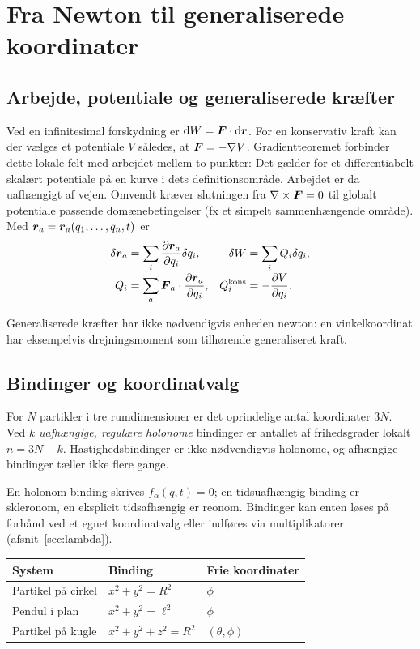 \clearpage\section{Fra Newton til generaliserede koordinater}
\subsection{Arbejde, potentiale og generaliserede kræfter}
Ved en infinitesimal forskydning er $\mathrm d W=\boldsymbol{F}\cdot \mathrm d\boldsymbol{r}$. For en konservativ kraft kan der vælges et potentiale $V$ således, at $\boldsymbol{F}=-\nabla V$.
Gradientteoremet forbinder dette lokale felt med arbejdet mellem to punkter:
Det gælder for et differentiabelt skalært potentiale på en kurve i dets definitionsområde. Arbejdet er da uafhængigt af vejen. Omvendt kræver slutningen fra $\nabla\times\boldsymbol{F}=0$ til globalt potentiale passende domænebetingelser (fx et simpelt sammenhængende område). Med $\boldsymbol{r}_a=\boldsymbol{r}_a(q_1,\ldots,q_n,t)$ er
\begin{align}
\delta\boldsymbol{r}_a&=\sum_i\frac{\partial \boldsymbol{r}_a}{\partial q_i}\delta q_i,&\delta W&=\sum_i Q_i\delta q_i,\\[-2pt]
Q_i&=\sum_a\boldsymbol{F}_a\cdot\frac{\partial \boldsymbol{r}_a}{\partial q_i},&Q_i^{\rm kons}&=-\frac{\partial V}{\partial q_i}.
\end{align}
\begin{note}Generaliserede kræfter har ikke nødvendigvis enheden newton: en vinkelkoordinat har eksempelvis drejningsmoment som tilhørende generaliseret kraft.\end{note}
\subsection{Bindinger og koordinatvalg}
For $N$ partikler i tre rumdimensioner er det oprindelige antal koordinater $3N$. Ved $k$ \emph{uafhængige, regulære holonome} bindinger er antallet af frihedsgrader lokalt $n=3N-k$. Hastighedsbindinger er ikke nødvendigvis holonome, og afhængige bindinger tæller ikke flere gange.

En holonom binding skrives $f_\alpha(q,t)=0$; en tidsuafhængig binding er skleronom, en eksplicit tidsafhængig er reonom. Bindinger kan enten løses på forhånd ved et egnet koordinatvalg eller indføres via multiplikatorer (afsnit~\ref{sec:lambda}).
\begin{center}\begin{tabular}{lll}\toprule System & Binding & Frie koordinater \\\midrule
Partikel på cirkel & $x^2+y^2=R^2$ & $\phi$\\
Pendul i plan & $x^2+y^2=\ell^2$ & $\phi$\\
Partikel på kugle & $x^2+y^2+z^2=R^2$ & $(\theta,\phi)$\\\bottomrule\end{tabular}\end{center}


